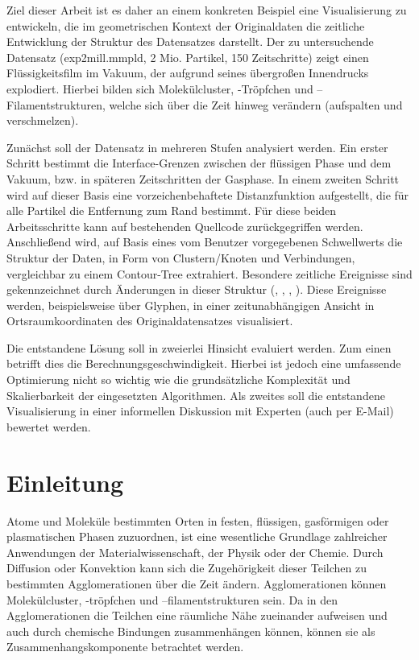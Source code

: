 Ziel dieser Arbeit ist es daher an einem konkreten Beispiel eine Visualisierung zu entwickeln, die im geometrischen Kontext der Originaldaten die zeitliche Entwicklung der Struktur des Datensatzes darstellt. Der zu untersuchende Datensatz (exp2mill.mmpld, 2 Mio. Partikel, 150 Zeitschritte) zeigt einen Flüssigkeitsfilm im Vakuum, der aufgrund seines übergroßen Innendrucks explodiert. Hierbei bilden sich Molekülcluster, -Tröpfchen und –Filamentstrukturen, welche sich über die Zeit hinweg verändern (aufspalten und verschmelzen).

Zunächst soll der Datensatz in mehreren Stufen analysiert werden. Ein erster Schritt bestimmt die Interface-Grenzen zwischen der flüssigen Phase und dem Vakuum, bzw. in späteren Zeitschritten der Gasphase. In einem zweiten Schritt wird auf dieser Basis eine vorzeichenbehaftete Distanzfunktion aufgestellt, die für alle Partikel die Entfernung zum Rand bestimmt. Für diese beiden Arbeitsschritte kann auf bestehenden Quellcode zurückgegriffen werden. Anschließend wird, auf Basis eines vom Benutzer vorgegebenen Schwellwerts die Struktur der Daten, in Form von Clustern/Knoten und Verbindungen, vergleichbar zu einem Contour-Tree extrahiert. Besondere zeitliche Ereignisse sind gekennzeichnet durch Änderungen in dieser Struktur (, , , ). Diese Ereignisse werden, beispielsweise über Glyphen, in einer zeitunabhängigen Ansicht in Ortsraumkoordinaten des Originaldatensatzes visualisiert.

Die entstandene Lösung soll in zweierlei Hinsicht evaluiert werden. Zum einen betrifft dies die Berechnungsgeschwindigkeit. Hierbei ist jedoch eine umfassende Optimierung nicht so wichtig wie die grundsätzliche Komplexität und Skalierbarkeit der eingesetzten Algorithmen. Als zweites soll die entstandene Visualisierung in einer informellen Diskussion mit Experten (auch per E-Mail) bewertet werden.


\chapter{Einleitung}\label{sec:einleitung}

Atome und Moleküle bestimmten Orten in festen, flüssigen, gasförmigen oder plasmatischen Phasen zuzuordnen, ist eine wesentliche Grundlage zahlreicher Anwendungen der Materialwissenschaft, der Physik oder der Chemie. %
Durch Diffusion oder Konvektion kann sich die Zugehörigkeit dieser Teilchen zu bestimmten Agglomerationen über die Zeit ändern. Agglomerationen können Molekülcluster, -tröpfchen und –filamentstrukturen sein. Da in den Agglomerationen die Teilchen eine räumliche Nähe zueinander aufweisen und auch durch chemische Bindungen zusammenhängen können, können sie als Zusammenhangskomponente betrachtet werden.

